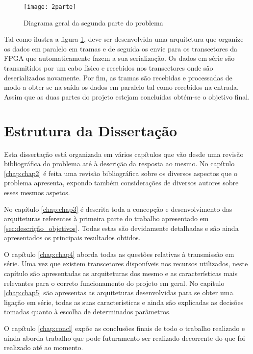 \begin{figure}[h!]
	\begin{center}
		\leavevmode
		\texttt{[image: 2parte]}
		\caption{Diagrama geral da segunda parte do problema}
		\label{fig:2parte_projeto}
	\end{center}
\end{figure}

Tal como ilustra a figura \ref{fig:2parte_projeto}, deve ser desenvolvida uma arquitetura que organize os dados em paralelo em tramas e de seguida os envie para os transcetores da FPGA que automaticamente fazem a sua serialização. Os dados em série são transmitidos por um cabo físico e recebidos nos transcetores onde são deserializados novamente. Por fim, as tramas são recebidas e processadas de modo a obter-se na saída os dados em paralelo tal como recebidos na entrada. Assim que as duas partes do projeto estejam concluídas obtém-se o objetivo final.

\section{Estrutura da Dissertação} \label{sec:struct}

Esta dissertação está organizada em vários capítulos que vão desde uma revisão bibliográfica do problema até à descrição da resposta ao mesmo. 
No capítulo \ref{chap:chap2} é feita uma revisão bibliográfica sobre os diversos aspectos que o problema apresenta, expondo também considerações de diversos autores sobre esses mesmos aspetos.  

No capítulo \ref{chap:chap3} é descrita toda a concepção e desenvolvimento das arquiteturas referentes à primeira parte do trabalho apresentado em \ref{sec:descrição_objetivos}. Todas estas são devidamente detalhadas e são ainda apresentados os principais resultados obtidos.

O capítulo \ref{chap:chap4} aborda todas as questões relativas à transmissão em série. Uma vez que existem transcetores disponíveis nos recursos utilizados, neste capítulo são apresentadas as arquiteturas dos mesmo e as características mais relevantes para o correto funcionamento do projeto em geral. No capítulo \ref{chap:chap5} são apresentas as arquiteturas desenvolvidas para se obter uma ligação em série, todas as suas características e ainda são explicadas as decisões tomadas quanto à escolha de determinados parâmetros.

O capítulo \ref{chap:concl} expõe as conclusões finais de todo o trabalho realizado e ainda aborda trabalho que pode futuramento ser realizado decorrente do que foi realizado até ao momento.

